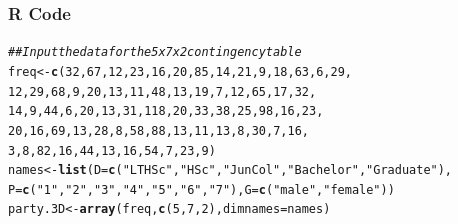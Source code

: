 \documentclass[oneside]{book}\usepackage[]{graphicx}\usepackage[svgnames]{xcolor}
\makeatletter
\newcommand{\hlnum}[1]{\textcolor[rgb]{0.686,0.059,0.569}{#1}}%
\newcommand{\hlstr}[1]{\textcolor[rgb]{0.192,0.494,0.8}{#1}}%
\newcommand{\hlcom}[1]{\textcolor[rgb]{0.678,0.584,0.686}{\textit{#1}}}%
\newcommand{\hlstd}[1]{\textcolor[rgb]{0.345,0.345,0.345}{#1}}%
\newcommand{\hlkwb}[1]{\textcolor[rgb]{0.69,0.353,0.396}{#1}}%
\newcommand{\hlkwc}[1]{\textcolor[rgb]{0.333,0.667,0.333}{#1}}%
\newcommand{\hlkwd}[1]{\textcolor[rgb]{0.737,0.353,0.396}{\textbf{#1}}}%
\newenvironment{kframe}{%
 \def\at@end@of@kframe{}%
 \ifinner\ifhmode%
  \def\at@end@of@kframe{\end{minipage}}%
  \begin{minipage}{\columnwidth}%
 \fi\fi%
 \def\FrameCommand##1{\hskip\@totalleftmargin \hskip-\fboxsep
 \colorbox{shadecolor}{##1}\hskip-\fboxsep
     \hskip-\linewidth \hskip-\@totalleftmargin \hskip\columnwidth}%
 \MakeFramed {\advance\hsize-\width
   \@totalleftmargin\z@ \linewidth\hsize
   \@setminipage}}%
 {\par\unskip\endMakeFramed%
 \at@end@of@kframe}
\newenvironment{knitrout}{}{} %
\makeatother
\begin{document}
\subsubsection*{R Code}
\begin{knitrout}
\color{fgcolor}\begin{kframe}
\begin{alltt}
\hlcom{## Input the data for the 5 x 7 x 2 contingency table}
\hlstd{freq} \hlkwb{<-} \hlkwd{c}\hlstd{(}\hlnum{32}\hlstd{,} \hlnum{67}\hlstd{,} \hlnum{12}\hlstd{,} \hlnum{23}\hlstd{,} \hlnum{16}\hlstd{,} \hlnum{20}\hlstd{,} \hlnum{85}\hlstd{,} \hlnum{14}\hlstd{,} \hlnum{21}\hlstd{,} \hlnum{9}\hlstd{,} \hlnum{18}\hlstd{,} \hlnum{63}\hlstd{,} \hlnum{6}\hlstd{,} \hlnum{29}\hlstd{,}
  \hlnum{12}\hlstd{,} \hlnum{29}\hlstd{,} \hlnum{68}\hlstd{,} \hlnum{9}\hlstd{,} \hlnum{20}\hlstd{,} \hlnum{13}\hlstd{,} \hlnum{11}\hlstd{,} \hlnum{48}\hlstd{,} \hlnum{13}\hlstd{,} \hlnum{19}\hlstd{,} \hlnum{7}\hlstd{,} \hlnum{12}\hlstd{,} \hlnum{65}\hlstd{,} \hlnum{17}\hlstd{,} \hlnum{32}\hlstd{,}
  \hlnum{14}\hlstd{,} \hlnum{9}\hlstd{,} \hlnum{44}\hlstd{,} \hlnum{6}\hlstd{,} \hlnum{20}\hlstd{,} \hlnum{13}\hlstd{,} \hlnum{31}\hlstd{,} \hlnum{118}\hlstd{,} \hlnum{20}\hlstd{,} \hlnum{33}\hlstd{,} \hlnum{38}\hlstd{,} \hlnum{25}\hlstd{,} \hlnum{98}\hlstd{,} \hlnum{16}\hlstd{,} \hlnum{23}\hlstd{,}
  \hlnum{20}\hlstd{,} \hlnum{16}\hlstd{,} \hlnum{69}\hlstd{,} \hlnum{13}\hlstd{,} \hlnum{28}\hlstd{,} \hlnum{8}\hlstd{,} \hlnum{58}\hlstd{,} \hlnum{88}\hlstd{,} \hlnum{13}\hlstd{,} \hlnum{11}\hlstd{,} \hlnum{13}\hlstd{,} \hlnum{8}\hlstd{,} \hlnum{30}\hlstd{,} \hlnum{7}\hlstd{,} \hlnum{16}\hlstd{,}
  \hlnum{3}\hlstd{,} \hlnum{8}\hlstd{,} \hlnum{82}\hlstd{,} \hlnum{16}\hlstd{,} \hlnum{44}\hlstd{,} \hlnum{13}\hlstd{,} \hlnum{16}\hlstd{,} \hlnum{54}\hlstd{,} \hlnum{7}\hlstd{,} \hlnum{23}\hlstd{,} \hlnum{9}\hlstd{)}
\hlstd{names} \hlkwb{<-} \hlkwd{list}\hlstd{(}\hlkwc{D} \hlstd{=} \hlkwd{c}\hlstd{(}\hlstr{"LT HSc"}\hlstd{,} \hlstr{"HSc"}\hlstd{,} \hlstr{"JunCol"}\hlstd{,} \hlstr{"Bachelor"}\hlstd{,} \hlstr{"Graduate"}\hlstd{),}
  \hlkwc{P} \hlstd{=} \hlkwd{c}\hlstd{(}\hlstr{"1"}\hlstd{,} \hlstr{"2"}\hlstd{,} \hlstr{"3"}\hlstd{,} \hlstr{"4"}\hlstd{,} \hlstr{"5"}\hlstd{,} \hlstr{"6"}\hlstd{,} \hlstr{"7"}\hlstd{),} \hlkwc{G} \hlstd{=} \hlkwd{c}\hlstd{(}\hlstr{"male"}\hlstd{,} \hlstr{"female"}\hlstd{))}
\hlstd{party.3D} \hlkwb{<-} \hlkwd{array}\hlstd{(freq,} \hlkwd{c}\hlstd{(}\hlnum{5}\hlstd{,} \hlnum{7}\hlstd{,} \hlnum{2}\hlstd{),} \hlkwc{dimnames} \hlstd{= names)}

\end{alltt}
\end{kframe}
\end{knitrout}
\end{document}
